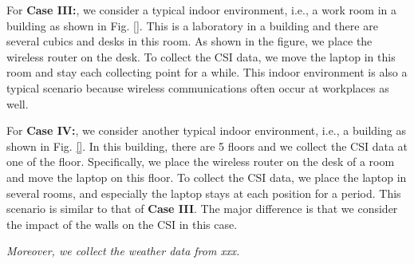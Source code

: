 \documentclass[10pt,journal,cspaper,compsoc]{IEEEtran}
\begin{document}
For \textbf{Case III:}, we consider a typical indoor environment, i.e., a work room in a building as shown in Fig. \ref{}. This is a laboratory in a building and there are several cubics and desks in this room. As shown in the figure, we place the wireless router on the desk. To collect the CSI data, we move the laptop in this room and stay each collecting point for a while. This indoor environment is also a typical scenario because wireless communications often occur at workplaces as well.



For \textbf{Case IV:}, we consider another typical indoor environment, i.e., a building as shown in Fig. \ref{}. In this building, there are 5 floors and we collect the CSI data at one of the floor. Specifically, we place the wireless router on the desk of a room and move the laptop on this floor. To collect the CSI data, we place the laptop in several rooms, and especially the laptop stays at each position for a period. This scenario is similar to that of \textbf{Case III}. The major difference is that we consider the impact of the walls on the CSI in this case.





\textit{Moreover, we collect the weather data from xxx.} 



\end{document}
